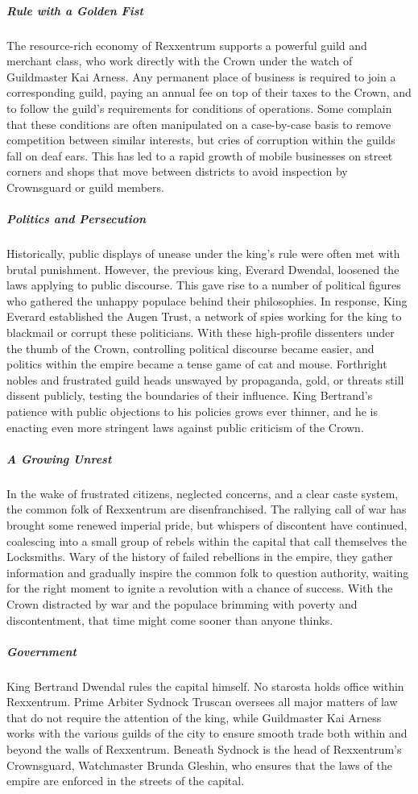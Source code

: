 \documentclass[10pt,a4paper,twoside,bg=print,twocolumn,openany,nodeprecatedcode]{dndbook}
\begin{document}
\subparagraph{Rule with a Golden Fist}
The resource-rich economy of Rexxentrum supports a powerful guild and merchant class, who work directly with the Crown under the watch of Guildmaster Kai Arness. Any permanent place of business is required to join a corresponding guild, paying an annual fee on top of their taxes to the Crown, and to follow the guild's requirements for conditions of operations. Some complain that these conditions are often manipulated on a case-by-case basis to remove competition between similar interests, but cries of corruption within the guilds fall on deaf ears. This has led to a rapid growth of mobile businesses on street corners and shops that move between districts to avoid inspection by Crownsguard or guild members.

\subparagraph{Politics and Persecution}
Historically, public displays of unease under the king's rule were often met with brutal punishment. However, the previous king, Everard Dwendal, loosened the laws applying to public discourse. This gave rise to a number of political figures who gathered the unhappy populace behind their philosophies. In response, King Everard established the Augen Trust, a network of spies working for the king to blackmail or corrupt these politicians. With these high-profile dissenters under the thumb of the Crown, controlling political discourse became easier, and politics within the empire became a tense game of cat and mouse. Forthright nobles and frustrated guild heads unswayed by propaganda, gold, or threats still dissent publicly, testing the boundaries of their influence. King Bertrand's patience with public objections to his policies grows ever thinner, and he is enacting even more stringent laws against public criticism of the Crown.

\subparagraph{A Growing Unrest}
In the wake of frustrated citizens, neglected concerns, and a clear caste system, the common folk of Rexxentrum are disenfranchised. The rallying call of war has brought some renewed imperial pride, but whispers of discontent have continued, coalescing into a small group of rebels within the capital that call themselves the Locksmiths. Wary of the history of failed rebellions in the empire, they gather information and gradually inspire the common folk to question authority, waiting for the right moment to ignite a revolution with a chance of success. With the Crown distracted by war and the populace brimming with poverty and discontentment, that time might come sooner than anyone thinks.

\subparagraph{Government}
King Bertrand Dwendal rules the capital himself. No starosta holds office within Rexxentrum. Prime Arbiter Sydnock Truscan oversees all major matters of law that do not require the attention of the king, while Guildmaster Kai Arness works with the various guilds of the city to ensure smooth trade both within and beyond the walls of Rexxentrum. Beneath Sydnock is the head of Rexxentrum's Crownsguard, Watchmaster Brunda Gleshin, who ensures that the laws of the empire are enforced in the streets of the capital.
\end{document}
